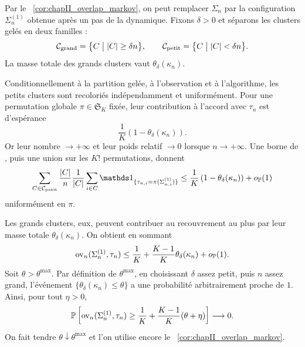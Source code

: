 \begin{Preuve}
Par le \Cor~\ref{cor:chapII_overlap_markov}, on peut remplacer $\Sigma_n$ par la configuration $\Sigma_n^{(1)}$ obtenue après un pas de la dynamique. Fixons $\delta>0$ et séparons les clusters gelés en deux familles :
\[
    \mathcal C_{\mathrm{grand}}=\bigl\{C \bigm| |C|\ge \delta n\bigr\},
    \qquad
    \mathcal C_{\mathrm{petit}}=\bigl\{C \bigm| |C|<\delta n\bigr\}.
\]
La masse totale des grands clusters vaut $\theta_\delta(\kappa_n)$.

Conditionnellement à la partition gelée, à l'observation et à l'algorithme, les petits clusters sont recoloriés indépendamment et uniformément. Pour une permutation globale $\pi\in\mathfrak S_K$ fixée, leur contribution à l'accord avec $\tau_n$ est d'espérance
\[
    \frac1K\left(1-\theta_\delta(\kappa_n)\right).
\]
Or leur nombre $\to +\infty$ et leur poids relatif $\to 0$ lorsque $n\to +\infty$.
Une borne de , puis une union sur les $K!$ permutations, donnent
\[
    \sum_{C\in\mathcal C_{\mathrm{petit}}}
    \frac{|C|}{n}
    \frac1{|C|}\sum_{i\in C}\ind{\tau_{n,i}=\pi(\Sigma_{n,i}^{(1)})}
    \le
    \frac1K\left(1-\theta_\delta(\kappa_n)\right)+o_{\mathbb P}(1)
\]
uniformément en $\pi$.

Les grands clusters, eux, peuvent contribuer au recouvrement au plus par leur masse totale $\theta_\delta(\kappa_n)$. On obtient en sommant
\[
    \operatorname{ov}_n(\Sigma_n^{(1)},\tau_n)
    \le
    \frac1K+\frac{K-1}{K}\theta_\delta(\kappa_n)
    +o_{\mathbb P}(1).
\]
Soit $\theta>\theta^{\max}$. Par définition de $\theta^{\max}$, en choisissant $\delta$ assez petit, puis $n$ assez grand, l'événement $\{\theta_\delta(\kappa_n)\le \theta\}$ a une probabilité arbitrairement proche de $1$. Ainsi, pour tout $\eta>0$,
\[
    \mathbb P\left[
        \operatorname{ov}_n(\Sigma_n^{(1)},\tau_n)
        \ge
        \frac1K+\frac{K-1}{K}(\theta+\eta)
    \right]\longrightarrow0.
\]
On fait tendre $\theta\downarrow\theta^{\max}$ et l'on utilise encore le \Cor~\ref{cor:chapII_overlap_markov}.
\end{Preuve}

